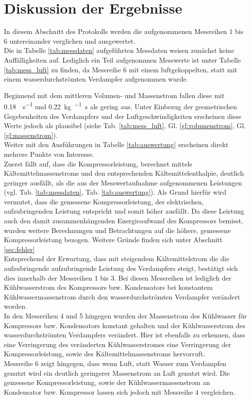 \newpage
\section{Diskussion der Ergebnisse}
\label{sec:diskussion}

In diesem Abschnitt des Protokolls werden die aufgenommenen Messreihen 1 bis 6 untereinander verglichen und ausgewertet.\\

Die in Tabelle \ref{tab:messdaten} aufgeführten Messdaten weisen zunächst keine Auffälligkeiten auf. Lediglich ein Teil aufgenommen Messwerte ist unter Tabelle \ref{tab:mess_luft} zu finden, da Messreihe 6 mit einem luftgekoppelten, statt mit einem wasserdurchströmten Verdampfer aufgenommen wurde.

Beginnend mit dem mittleren Volumen- und Massenstrom fallen diese mit \SI{0,18}{\kmeter \per \second} und \SI{0,22}{\kg \per \per \second} als gering aus. Unter Einbezug der geometrischen Gegebenheiten des Verdampfers und der Luftgeschwindigkeiten erscheinen diese Werte jedoch als plausibel (siehe Tab. \ref{tab:mess_luft}, Gl.  \ref{gl:volumenstrom}, Gl. \ref{gl:massenstrom}).\\

Weiter mit den Ausführungen in Tabelle \ref{tab:auswertung} erscheinen direkt mehrere Punkte von Interesse.\\
Zuerst fällt auf, dass die Kompressorleistung, berechnet mittels Kältemittelmassenstroms und den entsprechenden Kältemittelenthalpie, deutlich geringer ausfällt, als die aus der Messwertaufnahme aufgenommenen Leistungen (vgl. Tab. \ref{tab:messdaten}, Tab. \ref{tab:auswertung}). 
Als Grund hierfür wird vermutet, dass die gemessene Kompressorleistung, der elektrischen, aufzubringenden Leistung  entspricht und somit höher ausfällt. Da diese Leistung auch den damit zusammenhängenden Energieaufwand des Kompressors bemisst, wurden weitere Berechnungen und Betrachtungen auf die höhere, gemessene Kompressorleistung bezogen. Weitere Gründe finden sich unter Abschnitt \ref{sec:fehler}\\
Entsprechend der Erwartung, dass mit steigendem Kältemittelstrom die die aufzubringende aufzubringende Leistung des Verdampfers steigt, bestätigt sich dies innerhalb der Messreihen 1 bis 3. Bei diesen Messreihen ist lediglich der Kühlwasserstrom des Kompressors bzw. Kondensators
bei konstantem Kühlwassermassenstrom durch den wasserdurchströmten Verdampfer verändert worden.\\
In den Messreihen 4 und 5 hingegen wurden der Massenstrom des Kühlwasser für Kompressors bzw. Kondensators konstant gehalten und der Kühlwasserstrom des wasserdurchströmten Verdampfers verändert. Hier ist ebenfalls zu erkennen, dass eine Verringerung des veränderten Kühlwasserstromes eine Verringerung der Kompressorleistung, sowie des Kältemittelmassenstroms hervorruft.\\
Messreihe 6 zeigt hingegen, dass wenn Luft, statt Wasser zum Verdampfen genutzt wird ein deutlich geringerer Massenstrom an Luft genutzt wird. Die gemessene Kompressorleistung, sowie der Kühlwassermassenstrom an Kondensator bzw. Kompressor lassen sich jedoch mit Messreihe 4 vergleichen. \\

